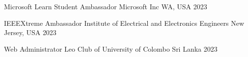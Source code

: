 \begin{cvhonors}

  \cvhonor
  {Microsoft Learn Student Ambassador} %
  {Microsoft Inc} %
  {WA, USA} %
  {2023} %

  \cvhonor
  {IEEEXtreme Ambassador} %
  {Institute of Electrical and Electronics Engineers} %
  {New Jersey, USA}
  {2023} %

  \cvhonor
  {Web Administrator} %
  {Leo Club of University of Colombo} %
  {Sri Lanka}
  {2023} %


\end{cvhonors}
